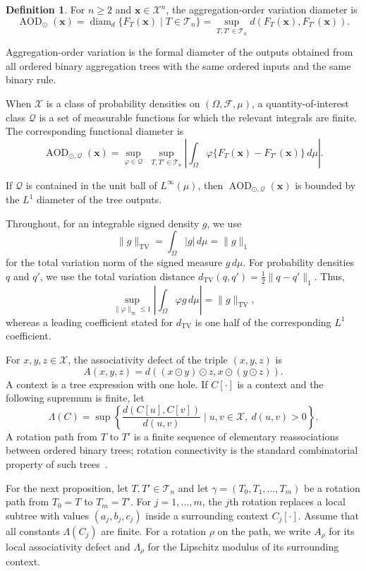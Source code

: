 \documentclass[11pt]{article}
\theoremstyle{plain}
\theoremstyle{definition}
\theoremstyle{definition}
\newtheorem{definition}{Definition}
\newcommand{\X}{\mathcal X}
\newcommand{\BT}{\mathcal T}
\newcommand{\AOD}{\operatorname{AOD}}
\newcommand{\op}{\odot}
\newcommand{\QoI}{\mathcal Q}
\newcommand{\diam}{\operatorname{diam}}
\begin{document}
\begin{definition}\label{def:puq}
For $n\ge2$ and $\mathbf{x}\in\X^n$, the aggregation-order variation diameter is
\[\AOD_{\op}(\mathbf{x})=\diam_{d}\{F_T(\mathbf{x}) \mid T\in\BT_n\}
 =\sup_{T,T'\in\BT_n}d(F_T(\mathbf{x}),F_{T'}(\mathbf{x})).\]
\end{definition}

Aggregation-order variation is the formal diameter of the outputs obtained from all ordered binary aggregation trees with the same ordered inputs and the same binary rule. 

When $\X$ is a class of probability densities on $(\Omega,\mathcal F,\mu)$, a quantity-of-interest class $\QoI$ is a set of measurable functions for which the relevant integrals are finite. The corresponding functional diameter is
\[\AOD_{\op,\QoI}(\mathbf{x})=
\sup_{\varphi\in\QoI}\,\, \sup_{T,T'\in\BT_n}
\left|\int_\Omega \varphi\{F_T(\mathbf{x})-F_{T'}(\mathbf{x})\}\,d\mu\right|.\]

If $\QoI$ is contained in the unit ball of $L^\infty(\mu)$, then $\AOD_{\op,\QoI}(\mathbf{x})$ is bounded by the $L^1$ diameter of the tree outputs.

Throughout, for an integrable signed density $g$, we use
\[
\|g\|_{\mathrm{TV}}=\int_\Omega |g|\,d\mu=\|g\|_1
\]
for the total variation norm of the signed measure $g\,d\mu$. For probability densities $q$ and $q'$, we use the total variation distance $d_{\mathrm{TV}}(q,q')=\frac12\|q-q'\|_1$. Thus,
\[
\sup_{\|\varphi\|_\infty\le1}\left|\int_\Omega\varphi g\,d\mu\right|=\|g\|_{\mathrm{TV}},
\]
whereas a leading coefficient stated for $d_{\mathrm{TV}}$ is one half of the corresponding $L^1$ coefficient.

For $x,y,z\in\X$, the associativity defect of the triple $(x,y,z)$ is
\[A(x,y,z)=d((x\op y)\op z,x\op(y\op z)).\]
A context is a tree expression with one hole. If $C[\cdot]$ is a context and the following supremum is finite, let
\[
\Lambda(C)=\sup\left\{\frac{d(C[u],C[v])}{d(u,v)} \mid u,v\in\X,\ d(u,v)>0\right\}.
\]
A rotation path from $T$ to $T'$ is a finite sequence of elementary reassociations between ordered binary trees; rotation connectivity is the standard combinatorial property of such trees~\cite{stasheff1963homotopy,mac1971categories}.

For the next proposition, let $T,T'\in\BT_n$ and let
$\gamma=(T_0,T_1,\ldots,T_m)$ be a rotation path from $T_0=T$ to $T_m=T'$. For $j=1,\ldots,m$, the $j$th rotation replaces a local subtree with values $(a_j,b_j,c_j)$ inside a surrounding context $C_j[\cdot]$. Assume that all constants $\Lambda(C_j)$ are finite. For a rotation $\rho$ on the path, we write $A_\rho$ for its local associativity defect and $\Lambda_\rho$ for the Lipschitz modulus of its surrounding context.
\end{document}
